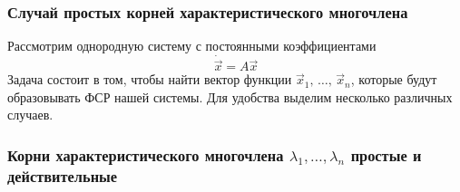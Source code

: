 \subsubsection*{Случай простых корней характеристического многочлена}
Рассмотрим однородную систему с постоянными коэффициентами
\begin{equation}
    \dot{\overrightarrow{x}} = A \overrightarrow{x} \label{eq:ODN}
\end{equation} 
Задача состоит в том, чтобы найти вектор функции $\overrightarrow{x}_1, \, \dots, \, \overrightarrow{x}_n$, которые будут образовывать ФСР нашей системы. Для удобства выделим несколько различных случаев.

\subsubsection*{Корни характеристического многочлена $\lambda_1, \dots, \lambda_n$ простые и действительные}

